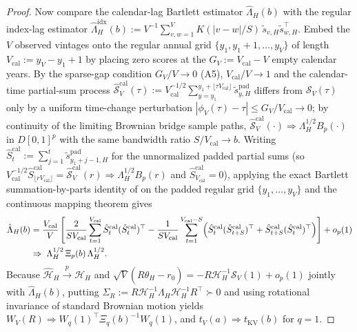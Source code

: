 \begin{proof}
Now compare the calendar-lag Bartlett estimator $\hat\Lambda_H(b)$ with the regular index-lag estimator $\hat\Lambda_H^{\mathrm{idx}}(b) := V^{-1}\sum_{v,w=1}^V K(|v-w|/S)\,\tilde{s}_{v,H}\tilde{s}_{w,H}^\top$.
Embed the $V$ observed vintages onto the regular annual grid $\{y_1, y_1+1, \dots, y_V\}$ of length $V_{\mathrm{cal}} := y_V - y_1 + 1$ by placing zero scores at the $G_V := V_{\mathrm{cal}} - V$ empty calendar years.
By the sparse-gap condition $G_V / V \to 0$ (A5), $V_{\mathrm{cal}}/V \to 1$ and the calendar-time partial-sum process $\hat{\mathcal{S}}_{V}^{\mathrm{cal}}(\tau) := V_{\mathrm{cal}}^{-1/2}\sum_{y=y_1}^{y_1+\lfloor \tau V_{\mathrm{cal}}\rfloor} \tilde{s}_{y,H}^{\mathrm{pad}}$ differs from $\hat{\mathcal{S}}_V(\tau)$ only by a uniform time-change perturbation $|\phi_V(\tau) - \tau| \le G_V/V_{\mathrm{cal}} \to 0$; by continuity of the limiting Brownian bridge sample paths, $\hat{\mathcal{S}}_V^{\mathrm{cal}}(\cdot) \Rightarrow \Lambda_H^{1/2} B_p(\cdot)$ in $D[0,1]^p$ with the same bandwidth ratio $S/V_{\mathrm{cal}} \to b$.
Writing $\hat{S}_t^{\mathrm{cal}} := \sum_{j=1}^t \tilde{s}_{y_1+j-1,H}^{\mathrm{pad}}$ for the unnormalized padded partial sums (so $V_{\mathrm{cal}}^{-1/2}\hat{S}_{\lfloor r V_{\mathrm{cal}}\rfloor}^{\mathrm{cal}} = \hat{\mathcal{S}}_V^{\mathrm{cal}}(r) \Rightarrow \Lambda_H^{1/2} B_p(r)$ and $\hat{S}_{V_{\mathrm{cal}}}^{\mathrm{cal}} = 0$), applying the exact Bartlett summation-by-parts identity of \citet[Theorem~1 and Theorem~2]{KV05} on the padded regular grid $\{y_1,\dots,y_V\}$ and the continuous mapping theorem gives
\begin{align*}
\hat\Lambda_H(b)
&= \frac{V_{\mathrm{cal}}}{V}\left[\frac{2}{S V_{\mathrm{cal}}}\sum_{t=1}^{V_{\mathrm{cal}}} \hat{S}_t^{\mathrm{cal}}(\hat{S}_t^{\mathrm{cal}})^\top - \frac{1}{S V_{\mathrm{cal}}}\sum_{t=1}^{V_{\mathrm{cal}}-S}\Bigl(\hat{S}_t^{\mathrm{cal}}(\hat{S}_{t+S}^{\mathrm{cal}})^\top + \hat{S}_{t+S}^{\mathrm{cal}}(\hat{S}_t^{\mathrm{cal}})^\top\Bigr)\right] + o_p(1) \\
&\Rightarrow\; \Lambda_H^{1/2}\,\Xi_p(b)\,\Lambda_H^{1/2}.
\end{align*}
Because $\hat{\mathcal{H}}_H \xrightarrow{p} \mathcal{H}_H$ and $\sqrt{V}(R\hat\theta_H - r_0) = -R\mathcal{H}_H^{-1}\mathcal{S}_V(1) + o_p(1)$ jointly with $\hat\Lambda_H(b)$, putting $\Sigma_R := R\mathcal{H}_H^{-1}\Lambda_H\mathcal{H}_H^{-1} R^\top \succ 0$ and using rotational invariance of standard Brownian motion yields $W_V(R) \Rightarrow W_q(1)^\top \Xi_q(b)^{-1} W_q(1)$, and $t_V(a) \Rightarrow t_{\mathrm{KV}}(b)$ for $q = 1$.


\end{proof}

